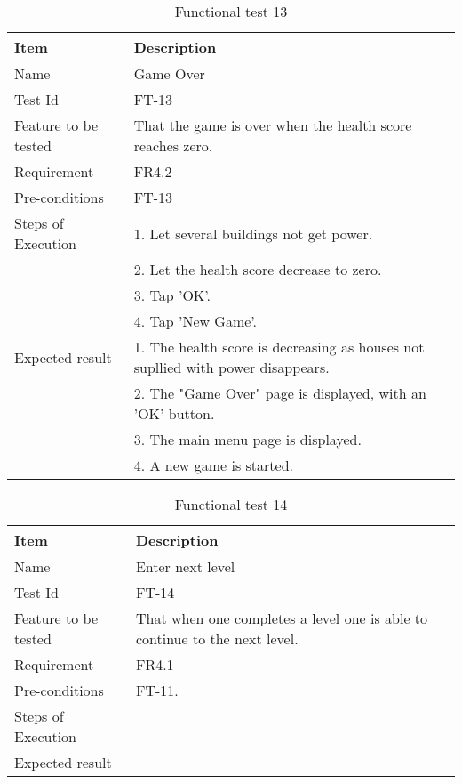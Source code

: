 \begin{table}[H]
\centering
	\begin{tabular}{ l | p{8cm} }
		\hline
		{\bf Item} & {\bf Description} \\ \hline
		Name & Game Over \\ 
		Test Id & FT-13 \\ 
		Feature to be tested & That the game is over when the health score reaches zero. \\ 
		Requirement & FR4.2 \\ 
		Pre-conditions & FT-13 \\ 
		Steps of Execution & 1. Let several buildings not get power. \\ 
		& 2. Let the health score decrease to zero. \\
		& 3. Tap 'OK'. \\
		& 4. Tap 'New Game'. \\
		Expected result & 1. The health score is decreasing as houses not supllied with power disappears. \\
		& 2. The "Game Over" page is displayed, with an 'OK' button. \\
		& 3. The main menu page is displayed. \\
		& 4. A new game is started. \\
	\end{tabular}
	\caption{Functional test 13}
\end{table}

\begin{table}[H]
\centering
	\begin{tabular}{ l | p{8cm} }
		\hline
		{\bf Item} & {\bf Description} \\ \hline
		Name & Enter next level \\ 
		Test Id & FT-14 \\ 
		Feature to be tested & That when one completes a level one is able to continue to the next level. \\ 
		Requirement & FR4.1 \\ 
		Pre-conditions & FT-11. \\ 
		Steps of Execution & \\ 
		Expected result & \\ 
	\end{tabular}
	\caption{Functional test 14}
\end{table}

